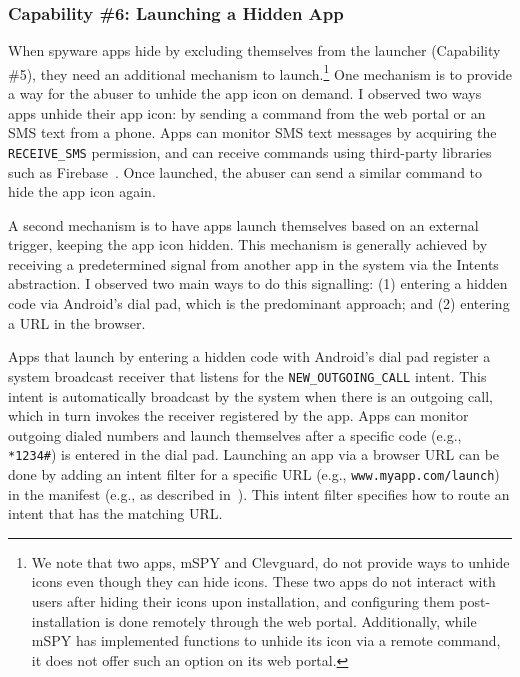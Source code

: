 \subsubsection*{Capability \#6: Launching a Hidden App}
\label{subsubsec:launch_hidden_app}
When spyware apps hide by excluding themselves from the launcher
(Capability \#5), they need an additional mechanism to launch.\footnote{We note that two apps, mSPY and Clevguard, do not provide ways to unhide icons even though they can hide icons.
These two apps do not interact with users after hiding their icons upon installation, and configuring them post-installation is done remotely through the web portal. Additionally, while mSPY has implemented functions to unhide its icon via a remote command, it does not offer such an option on its web portal.}  One
mechanism is to provide a way for the abuser to unhide the app icon on
demand.  I observed two ways apps unhide their app icon: by sending a
command from the web portal or an SMS text from a phone. Apps can
monitor SMS text messages by acquiring the \texttt{RECEIVE\_SMS}
permission, and can receive commands using third-party libraries such
as Firebase~\cite{Firebase21:online}.  Once launched, the abuser
can send a similar command to hide the app icon again.

A second mechanism is to have apps
launch themselves based on an external trigger,
keeping the app icon hidden.
This mechanism is generally achieved by
receiving a predetermined signal from another app in the system via the Intents
abstraction. I observed two main ways to do this signalling: (1) entering a hidden code via
Android's dial pad, which is the predominant approach; and (2) entering a URL in
the browser.

Apps that launch by entering a hidden code with Android's dial pad
register a system broadcast receiver that listens for the
\texttt{NEW\_OUTGOING\_CALL} intent. This intent is automatically broadcast by
the system when there is an outgoing call, which in turn invokes the receiver
registered by the app.  Apps can monitor outgoing dialed numbers and launch
themselves after a specific code (e.g.,
\texttt{*1234\#}) is entered in the dial pad.
Launching an app via a browser URL can be done by
adding an intent filter for a specific URL (e.g.,
\texttt{www.myapp.com/launch}) in the manifest (e.g., as described in~\cite{CreateDe16:online}). This intent filter specifies how to route an
intent that has the matching URL.

